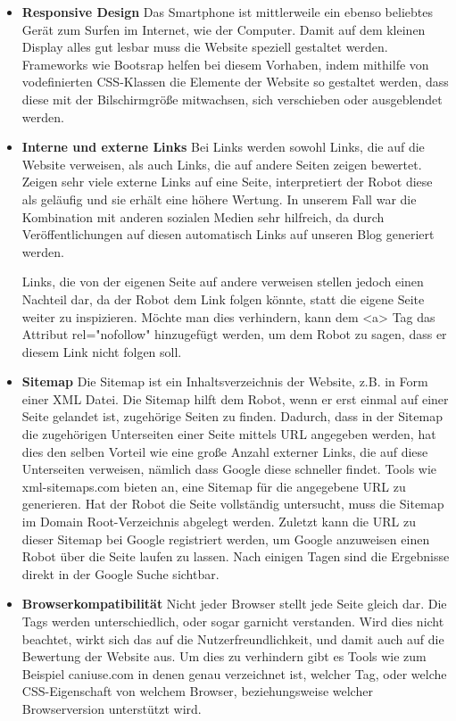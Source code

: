 {\begin{itemize}
      \item \textbf{Responsive Design}
        Das Smartphone ist mittlerweile ein ebenso beliebtes Gerät zum Surfen im Internet, wie der Computer. Damit auf dem kleinen Display alles gut lesbar muss die Website speziell
        gestaltet werden. Frameworks wie Bootsrap helfen bei diesem Vorhaben, indem mithilfe von vodefinierten CSS-Klassen die Elemente der Website so gestaltet werden, dass diese mit der
        Bilschirmgröße mitwachsen, sich verschieben oder ausgeblendet werden.

      \item \textbf{Interne und externe Links}
        Bei Links werden sowohl Links, die auf die Website verweisen, als auch Links, die auf andere Seiten zeigen bewertet.
        Zeigen sehr viele externe Links auf eine Seite, interpretiert der Robot diese als geläufig und sie erhält eine höhere Wertung. In unserem Fall war die Kombination mit anderen sozialen
        Medien sehr hilfreich, da durch Veröffentlichungen auf diesen automatisch Links auf unseren Blog generiert werden.

        Links, die von der eigenen Seite auf andere verweisen stellen jedoch einen Nachteil dar, da der Robot dem Link folgen könnte, statt die eigene Seite weiter zu inspizieren. Möchte man dies
        verhindern, kann dem <a> Tag das Attribut rel="nofollow" hinzugefügt werden, um dem Robot zu sagen, dass er diesem Link nicht folgen soll.

      \item \textbf{Sitemap}
      	Die Sitemap ist ein Inhaltsverzeichnis der Website, z.B. in Form einer XML Datei. Die Sitemap hilft dem Robot, wenn er erst einmal auf einer Seite gelandet ist, zugehörige Seiten
        zu finden. Dadurch, dass in der Sitemap die zugehörigen Unterseiten einer Seite mittels URL angegeben werden, hat dies den selben Vorteil wie eine große Anzahl externer Links, die auf diese
        Unterseiten verweisen, nämlich dass Google diese schneller findet. Tools wie xml-sitemaps.com bieten an, eine Sitemap für die angegebene URL zu generieren. Hat der Robot die Seite vollständig
        untersucht, muss die Sitemap im Domain Root-Verzeichnis abgelegt werden. Zuletzt kann die URL zu dieser Sitemap bei Google registriert werden, um Google anzuweisen einen Robot über die Seite
        laufen zu lassen. Nach einigen Tagen sind die Ergebnisse direkt in der Google Suche sichtbar.

      \item \textbf{Browserkompatibilität}
        Nicht jeder Browser stellt jede Seite gleich dar. Die Tags werden unterschiedlich, oder sogar garnicht verstanden. Wird dies nicht beachtet, wirkt sich das auf die Nutzerfreundlichkeit,
        und damit auch auf die Bewertung der Website aus. Um dies zu verhindern gibt es Tools wie zum Beispiel caniuse.com in denen genau verzeichnet ist, welcher Tag, oder welche CSS-Eigenschaft
        von welchem Browser, beziehungsweise welcher Browserversion unterstützt wird.


\end{itemize}}
